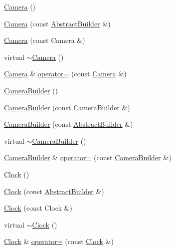 \begin{DoxyCompactItemize}
\item 
\hyperlink{namespacejli_ad3d15c9bf468345cc46e47bf7dd7d3e3}{Camera} ()
\item 
\hyperlink{namespacejli_a97fa95992b76788ae3feb7c62ddd6168}{Camera} (const \hyperlink{classjli_1_1_abstract_builder}{Abstract\+Builder} \&)
\item 
\hyperlink{namespacejli_a987bfeb3ffde7a3a032e131c6c356c53}{Camera} (const Camera \&)
\item 
virtual \hyperlink{namespacejli_a9407d365ccc6d206674e5a5869758943}{$\sim$\+Camera} ()
\item 
\hyperlink{namespacejli_ad3d15c9bf468345cc46e47bf7dd7d3e3}{Camera} \& \hyperlink{namespacejli_ae0ca0605362d0f66744c6b8c44e73adb}{operator=} (const \hyperlink{namespacejli_ad3d15c9bf468345cc46e47bf7dd7d3e3}{Camera} \&)
\item 
\hyperlink{namespacejli_ac774207b2ca46f60adc7d58d5252ebec}{Camera\+Builder} ()
\item 
\hyperlink{namespacejli_a8fe2558f8fe1d572700b414f9c0ccdf0}{Camera\+Builder} (const Camera\+Builder \&)
\item 
\hyperlink{namespacejli_a2dd10cbeedd42092b35159fd713834f3}{Camera\+Builder} (const \hyperlink{classjli_1_1_abstract_builder}{Abstract\+Builder} \&)
\item 
virtual \hyperlink{namespacejli_af4eb98dba938417574ac1607e82a5da6}{$\sim$\+Camera\+Builder} ()
\item 
\hyperlink{namespacejli_ac774207b2ca46f60adc7d58d5252ebec}{Camera\+Builder} \& \hyperlink{namespacejli_a75dbc7e82adc58eea850e84fbc0db767}{operator=} (const \hyperlink{namespacejli_ac774207b2ca46f60adc7d58d5252ebec}{Camera\+Builder} \&)
\item 
\hyperlink{namespacejli_af69056b00744493ba074ef13e82b0bec}{Clock} ()
\item 
\hyperlink{namespacejli_a334855814780bf6b3108045f5bf20c40}{Clock} (const \hyperlink{classjli_1_1_abstract_builder}{Abstract\+Builder} \&)
\item 
\hyperlink{namespacejli_a7ce97585499e25f837d2b1a14a4af4ce}{Clock} (const Clock \&)
\item 
virtual \hyperlink{namespacejli_aad1ce3f2fd2e7830b0fed2a040647134}{$\sim$\+Clock} ()
\item 
\hyperlink{namespacejli_af69056b00744493ba074ef13e82b0bec}{Clock} \& \hyperlink{namespacejli_a1ff847178b6d16582b0c1ca11c646090}{operator=} (const \hyperlink{namespacejli_af69056b00744493ba074ef13e82b0bec}{Clock} \&)
\item 

\end{DoxyCompactItemize}
